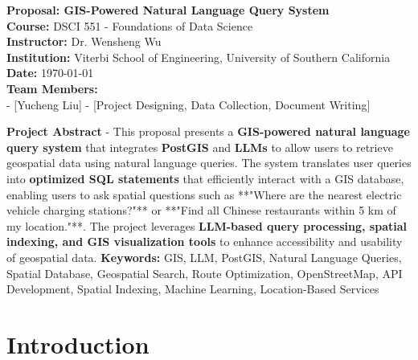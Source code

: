 \documentclass{article}
\begin{document}
\begin{titlepage}
    \centering
    \vspace*{2cm}
    {\Huge \textbf{Proposal: GIS-Powered Natural Language Query System}} \\
    \vspace{1.5cm}
    \textbf{Course:} DSCI 551 - Foundations of Data Science \\
    \textbf{Instructor:} Dr. Wensheng Wu \\
    \textbf{Institution:} Viterbi School of Engineering, University of Southern California \\
    \textbf{Date:} \today \\
    \vfill
    \textbf{Team Members:} \\
    - [Yucheng Liu] - [Project Designing, Data Collection, Document Writing] \\
    \vfill
    \begin{justify}
        \textbf{Project Abstract} - This proposal presents a \textbf{GIS-powered natural language query system} that integrates \textbf{PostGIS} and \textbf{LLMs} to allow users to retrieve geospatial data using natural language queries. The system translates user queries into \textbf{optimized SQL statements} that efficiently interact with a GIS database, enabling users to ask spatial questions such as **"Where are the nearest electric vehicle charging stations?"** or **"Find all Chinese restaurants within 5 km of my location."**. The project leverages \textbf{LLM-based query processing, spatial indexing, and GIS visualization tools} to enhance accessibility and usability of geospatial data.
        \vfill
        \textbf{Keywords:} GIS, LLM, PostGIS, Natural Language Queries, Spatial Database, Geospatial Search, Route Optimization, OpenStreetMap, API Development, Spatial Indexing, Machine Learning, Location-Based Services
    \end{justify}

\end{titlepage}

\section{Introduction}


\end{document}
